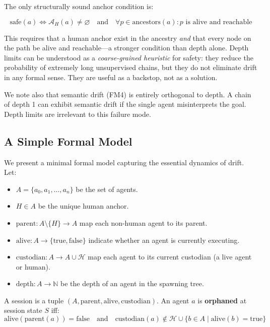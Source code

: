 The only structurally sound anchor condition is:

\begin{equation}
\text{safe}(a) \iff \mathcal{A}_H(a) \neq \varnothing \quad \text{and} \quad \forall p \in \text{ancestors}(a): p \text{ is alive and reachable}
\label{eq:anchor_condition}
\end{equation}

This requires that a human anchor exist in the ancestry \textit{and} that every node on the path be alive and reachable—a stronger condition than depth alone. Depth limits can be understood as a \textit{coarse-grained heuristic} for safety: they reduce the probability of extremely long unsupervised chains, but they do not eliminate drift in any formal sense. They are useful as a backstop, not as a solution.

We note also that semantic drift (FM4) is entirely orthogonal to depth. A chain of depth 1 can exhibit semantic drift if the single agent misinterprets the goal. Depth limits are irrelevant to this failure mode.

\subsection{A Simple Formal Model}

We present a minimal formal model capturing the essential dynamics of drift. Let:

\begin{itemize}
    \item $A = \{a_0, a_1, \dots, a_n\}$ be the set of agents.
    \item $H \in A$ be the unique human anchor.
    \item $\text{parent}: A \setminus \{H\} \to A$ map each non-human agent to its parent.
    \item $\text{alive}: A \to \{\text{true}, \text{false}\}$ indicate whether an agent is currently executing.
    \item $\text{custodian}: A \to A \cup \mathcal{H}$ map each agent to its current custodian (a live agent or human).
    \item $\text{depth}: A \to \mathbb{N}$ be the depth of an agent in the spawning tree.
\end{itemize}

A session is a tuple $(A, \text{parent}, \text{alive}, \text{custodian})$. An agent $a$ is \textbf{orphaned} at session state $S$ iff:
\begin{equation}
\text{alive}(\text{parent}(a)) = \text{false} \quad \text{and} \quad \text{custodian}(a) \notin \mathcal{H} \cup \{b \in A \mid \text{alive}(b) = \text{true}\}
\end{equation}

